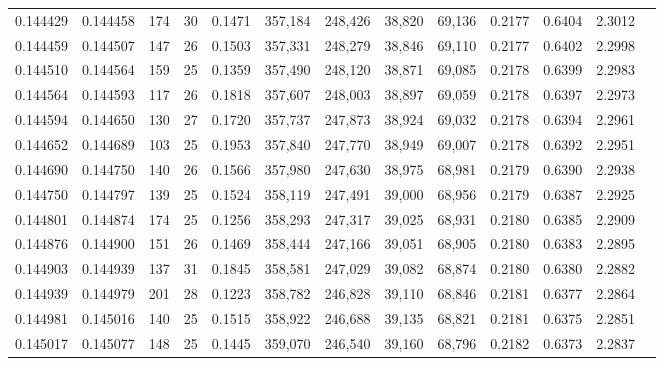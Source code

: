 \begin{tabular}{rrrrrrrrrrrrr}
0.144429 & 0.144458 & 174 &  30 &                                     0.1471 & 357,184 & 248,426 &  38,820 &  69,136 & 0.2177 & 0.6404 & 2.3012 \\
0.144459 & 0.144507 & 147 &  26 &                                     0.1503 & 357,331 & 248,279 &  38,846 &  69,110 & 0.2177 & 0.6402 & 2.2998 \\
0.144510 & 0.144564 & 159 &  25 &                                     0.1359 & 357,490 & 248,120 &  38,871 &  69,085 & 0.2178 & 0.6399 & 2.2983 \\
0.144564 & 0.144593 & 117 &  26 &                                     0.1818 & 357,607 & 248,003 &  38,897 &  69,059 & 0.2178 & 0.6397 & 2.2973 \\
0.144594 & 0.144650 & 130 &  27 &                                     0.1720 & 357,737 & 247,873 &  38,924 &  69,032 & 0.2178 & 0.6394 & 2.2961 \\
0.144652 & 0.144689 & 103 &  25 &                                     0.1953 & 357,840 & 247,770 &  38,949 &  69,007 & 0.2178 & 0.6392 & 2.2951 \\
0.144690 & 0.144750 & 140 &  26 &                                     0.1566 & 357,980 & 247,630 &  38,975 &  68,981 & 0.2179 & 0.6390 & 2.2938 \\
0.144750 & 0.144797 & 139 &  25 &                                     0.1524 & 358,119 & 247,491 &  39,000 &  68,956 & 0.2179 & 0.6387 & 2.2925 \\
0.144801 & 0.144874 & 174 &  25 &                                     0.1256 & 358,293 & 247,317 &  39,025 &  68,931 & 0.2180 & 0.6385 & 2.2909 \\
0.144876 & 0.144900 & 151 &  26 &                                     0.1469 & 358,444 & 247,166 &  39,051 &  68,905 & 0.2180 & 0.6383 & 2.2895 \\
0.144903 & 0.144939 & 137 &  31 &                                     0.1845 & 358,581 & 247,029 &  39,082 &  68,874 & 0.2180 & 0.6380 & 2.2882 \\
0.144939 & 0.144979 & 201 &  28 &                                     0.1223 & 358,782 & 246,828 &  39,110 &  68,846 & 0.2181 & 0.6377 & 2.2864 \\
0.144981 & 0.145016 & 140 &  25 &                                     0.1515 & 358,922 & 246,688 &  39,135 &  68,821 & 0.2181 & 0.6375 & 2.2851 \\
0.145017 & 0.145077 & 148 &  25 &                                     0.1445 & 359,070 & 246,540 &  39,160 &  68,796 & 0.2182 & 0.6373 & 2.2837 \\

\end{tabular}
